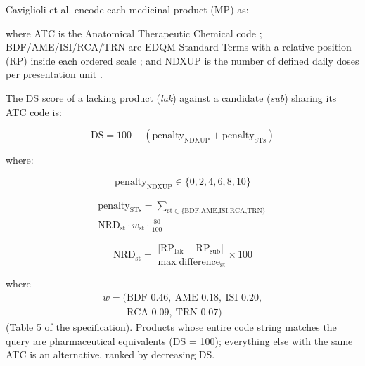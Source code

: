 \documentclass[a4paper]{elsarticle}
\begin{document}
Caviglioli et al.\citep{caviglioli2025medicine} encode each medicinal product (MP) as:


where ATC is the Anatomical Therapeutic Chemical code \citep{who2026atcddd}; BDF/AME/ISI/RCA/TRN are EDQM Standard Terms with a relative position (RP) inside each ordered scale \citep{edqm2024standard,iso202311239}; and NDXUP is the number of defined daily doses per presentation unit \citep{who2026atcddd}.

The DS score of a lacking product (\emph{lak}) against a candidate (\emph{sub}) sharing its ATC code is:

\begin{equation}
\text{DS} = 100 - (\text{penalty}_{\text{NDXUP}} + \text{penalty}_{\text{STs}})
\label{eq:ds}
\end{equation}

where:

\begin{equation}
\text{penalty}_{\text{NDXUP}} \in \{0,2,4,6,8,10\}
\label{eq:ndxup}
\end{equation}

\begin{equation}
\begin{gathered}
\text{penalty}_{\text{STs}} = \sum_{\text{st}\in\{\text{BDF,AME,ISI,RCA,TRN}\}} \\
\text{NRD}_{\text{st}} \cdot w_{\text{st}} \cdot \frac{80}{100}
\end{gathered}
\label{eq:st}
\end{equation}

\begin{equation}
\text{NRD}_{\text{st}} = \frac{|\text{RP}_{\text{lak}} - \text{RP}_{\text{sub}}|}{\max\text{difference}_{\text{st}}} \times 100
\label{eq:nrd}
\end{equation}

where
\begin{equation*}
\begin{gathered}
w = (\text{BDF }0.46,\ \text{AME }0.18,\ \text{ISI }0.20,\\
\phantom{w = (}\text{RCA }0.09,\ \text{TRN }0.07)
\end{gathered}
\end{equation*}
(Table 5 of the specification).
Products whose entire code string matches the query are pharmaceutical equivalents (DS = 100); everything else with the same ATC is an alternative, ranked by decreasing DS.
\end{document}
